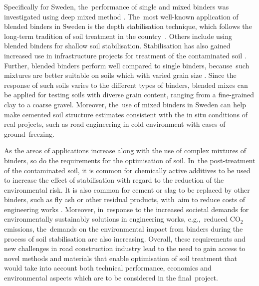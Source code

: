 \documentclass[materials,article,accept,pdftex,moreauthors]{Definitions/mdpi}
\begin{document}
{Specifically for Sweden, the~performance of single and mixed binders was investigated using deep mixed method \citep{Ahnberg1995,HolmAhnberg}. The~most well-known application of blended binders in Sweden is the depth stabilisation technique, which follows the long-term tradition of soil treatment in the country~\cite{Bjerrum}. Others include using blended binders for shallow soil stabilisation. Stabilisation has also gained increased use in infrastructure projects for treatment of the contaminated soil \citep{Sorengard,LindhLemenkova2022b}. Further, blended binders perform well compared to single binders, because~such mixtures are better suitable on soils which with varied grain size \citep{ElMahdi,Syed}. Since the response of such soils varies to the different types of binders, blended mixes can be applied for testing soils with diverse grain content, ranging from a fine-grained clay to a coarse gravel. Moreover, the~use of mixed binders in Sweden can help make cemented soil structure estimates consistent with the  {in situ}   conditions of real projects, such as road engineering in cold environment with cases of ground~freezing. 

As the areas of applications increase along with the use of complex mixtures of binders, so do the requirements for the optimisation of soil. In~the post-treatment of the contaminated soil, it is common for chemically active additives to be used to increase the effect of stabilisation with regard to the reduction of the environmental risk. It is also common for cement or slag to be replaced by other binders, such as fly ash or other residual products, with~aim to reduce costs of engineering works \citep{Arulrajah,LindhLemenkova2022a,Jaferetal2018}. Moreover, in~response to the increased societal demands for environmentally sustainably solutions in engineering works, e.g.,~reduced CO$_2$ emissions, the~demands on the environmental impact from binders during the process of soil stabilisation are also increasing. Overall, these requirements and new challenges in road construction industry lead to the need to gain access to novel methods and materials that enable optimisation of soil treatment that would take into account both technical performance, economics and environmental aspects which are to be considered in the final~project.

}
\end{document}
